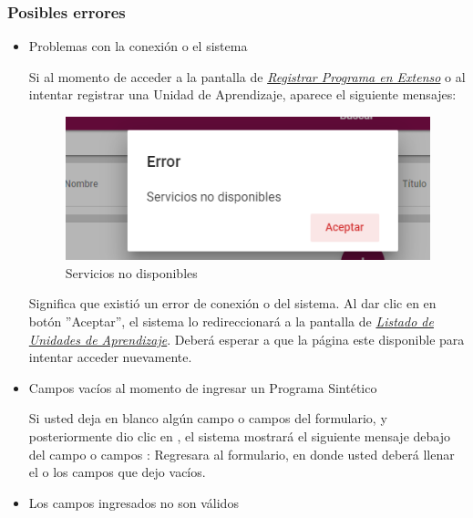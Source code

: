 \subsubsection{Posibles errores}

    \begin{itemize}
        \item Problemas con la conexión o el sistema

        Si al momento de acceder a la pantalla de \hyperlink{RegPE}{\textit{Registrar Programa en Extenso}} o al intentar registrar una Unidad de Aprendizaje, aparece el siguiente mensajes:

        \begin{figure}[H]
            \centering
            \includegraphics[width=0.4\linewidth]{images/SP6/MSGSN.png}
            \caption{Servicios no disponibles}
            \label{SND}

        \end{figure}

        Significa que existió un error de conexión o del sistema. Al dar clic en en botón ''Aceptar'', el sistema lo redireccionará a la pantalla de \hyperlink{verTareas}{\textit{Listado de Unidades de Aprendizaje}}. Deberá esperar a que la página este disponible para  intentar acceder nuevamente.

        \item Campos vacíos al momento de ingresar un Programa Sintético

        Si usted deja en blanco algún campo o campos del formulario, y posteriormente dio clic en , el sistema mostrará el siguiente mensaje debajo del campo o campos :
       Regresara al formulario, en donde usted deberá llenar el o los campos que dejo vacíos.

       \item Los campos ingresados no son válidos


\end{itemize}
